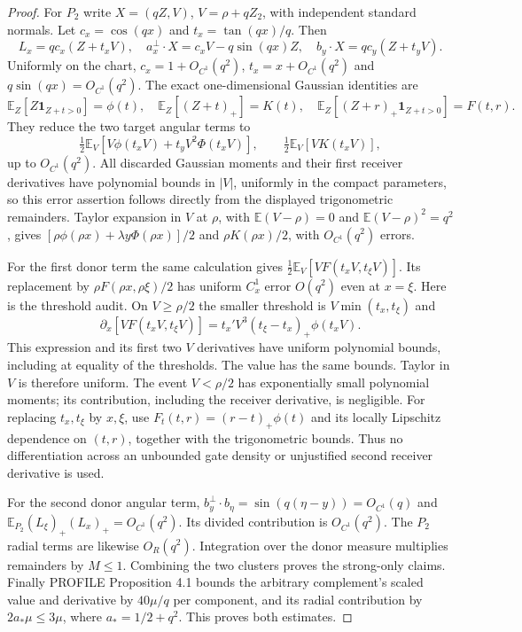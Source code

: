 \documentclass[11pt]{article}
\theoremstyle{remark}\newtheorem{remark}[theorem]{Remark}
\newcommand{\E}{\mathbb E}
\newcommand{\one}{\mathbf1}
\begin{document}
\begin{proof}
For $P_2$ write $X=(qZ,V)$, $V=\rho+qZ_2$, with independent
standard normals. Let $c_x=\cos(qx)$ and $t_x=\tan(qx)/q$.
Then
\[
 L_x=qc_x(Z+t_xV),\quad
 a_x^\perp\cdot X=c_xV-q\sin(qx)Z,\quad
 b_y\cdot X=qc_y(Z+t_yV).
\]
Uniformly on the chart, $c_x=1+O_{C^1}(q^2)$,
$t_x=x+O_{C^1}(q^2)$ and $q\sin(qx)=O_{C^1}(q^2)$.
The exact one-dimensional Gaussian identities are
\[
 \E_Z[Z\one_{Z+t>0}]=\phi(t),\quad
 \E_Z[(Z+t)_+]=K(t),\quad
 \E_Z[(Z+r)_+\one_{Z+t>0}]=F(t,r).
\]
They reduce the two target angular terms to
\[
 \tfrac12\E_V[V\phi(t_xV)+t_yV^2\Phi(t_xV)],
 \qquad \tfrac12\E_V[V K(t_xV)],
\]
up to $O_{C^1}(q^2)$. All discarded Gaussian moments and their
first receiver derivatives have polynomial bounds in $|V|$,
uniformly in the compact parameters, so this error assertion
follows directly from the displayed trigonometric remainders.
Taylor expansion in $V$ at $\rho$, with
$\E(V-\rho)=0$ and $\E(V-\rho)^2=q^2$, gives
$[\rho\phi(\rho x)+\lambda y\Phi(\rho x)]/2$
and $\rho K(\rho x)/2$, with $O_{C^1}(q^2)$ errors.

For the first donor term the same calculation gives
$\tfrac12\E_V[V F(t_xV,t_\xi V)]$.
Its replacement by $\rho F(\rho x,\rho\xi)/2$ has uniform
$C^1_x$ error $O(q^2)$ even at $x=\xi$.
Here is the threshold audit. On $V\ge\rho/2$ the smaller threshold
is $V\min(t_x,t_\xi)$ and
\[
 \partial_x[V F(t_xV,t_\xi V)]
   =t_x' V^3(t_\xi-t_x)_+\phi(t_xV).
\]
This expression and its first two $V$ derivatives have uniform
polynomial bounds, including at equality of the thresholds.
The value has the same bounds. Taylor in $V$ is therefore uniform.
The event $V<\rho/2$ has exponentially small polynomial moments;
its contribution, including the receiver derivative, is negligible.
For replacing $t_x,t_\xi$ by $x,\xi$, use
$F_t(t,r)=(r-t)_+\phi(t)$ and its locally Lipschitz dependence
on $(t,r)$, together with the trigonometric bounds.
Thus no differentiation across an unbounded gate density or
unjustified second receiver derivative is used.

For the second donor angular term,
$b_y^\perp\cdot b_\eta=\sin(q(\eta-y))=O_{C^1}(q)$
and $\E_{P_2}(L_\xi)_+(L_x)_+=O_{C^1}(q^2)$.
Its divided contribution is $O_{C^1}(q^2)$.
The $P_2$ radial terms are likewise $O_R(q^2)$.
Integration over the donor measure multiplies remainders by $M\le1$.
Combining the two clusters proves the strong-only claims.
Finally PROFILE Proposition 4.1 bounds the arbitrary complement's
scaled value and derivative by $40\mu/q$ per component, and its
radial contribution by $2a_*\mu\le3\mu$, where $a_*=1/2+q^2$.
This proves both estimates.
\end{proof}
\end{document}

